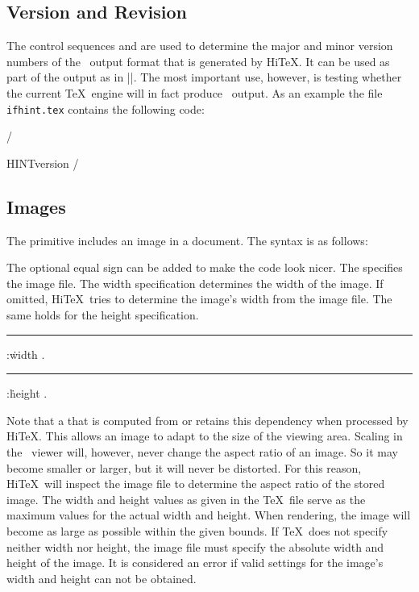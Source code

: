 \subsection{Version and Revision}
The control sequences 
and  are
used to determine the major and minor version numbers of the \HINT\ output format
that is generated by Hi\TeX. It can be used as part of the output as 
in \verbatim|\the\HINTversion|.
The most important use, however, is testing whether the current \TeX\ engine
will in fact produce \HINT\ output.
As an example the file {\tt ifhint.tex}
contains the following code:


\verbatim/
\newif\ifhint
\expandafter
  \ifx\csname HINTversion\endcsname\relax
  \hintfalse\else\hinttrue\fi/


\subsection{Images}
The primitive 
includes an image in a document.
The syntax is as follows:

\medskip
{}  \opt{\.{=}} 
  
\medskip

The optional equal sign can be added to make the code look nicer.
The  specifies the image file.
The width specification determines the width of the image. If omitted,
Hi\TeX\ tries to determine the image's width from the image file.
The same holds for the height specification.

\medskip
\rule {}:\.{width} .
\rule {}:\.{height} .
\medskip

Note that a  that is computed from 
or  retains this dependency when processed by Hi\TeX.
This allows an image to adapt to the size of the viewing area.
Scaling in the \HINT\ viewer will, however, never change the
aspect ratio of an image. So it may become smaller or larger,
but it will never be distorted.
For this reason, Hi\TeX\ will inspect the image file to determine the
aspect ratio of the stored image.
The width and height values as given in the \TeX\ file serve
as the maximum values for the actual width and height. When rendering,
the image will become as large as possible within the given bounds.
If \TeX\ does not specify neither width nor height, the image file
must specify the absolute width and height of the image.
It is considered an error if valid settings for the image's width and height
can not be obtained.



